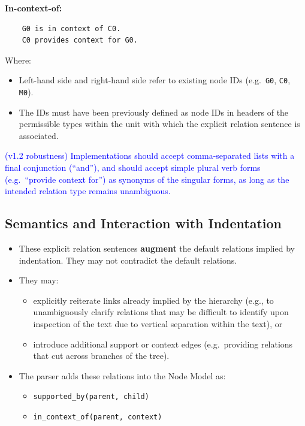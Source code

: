 \documentclass[11pt,twoside,a4paper]{article}
\begin{document}
\textbf{In-context-of:}
\begin{verbatim}
    G0 is in context of C0.
    C0 provides context for G0.
\end{verbatim}

Where:
\begin{itemize}[leftmargin=2em]
  \item Left-hand side and right-hand side refer to existing node IDs (e.g.\ \texttt{G0}, \texttt{C0}, \texttt{M0}).
  \item The IDs must have been previously defined as node IDs in headers of the permissible types within the unit with which the explicit relation sentence is associated.
\end{itemize}

\textcolor{blue}{(v1.2 robustness) Implementations should accept comma-separated lists with a final conjunction (``and''), and should accept simple plural verb forms (e.g.\ ``provide context for'') as synonyms of the singular forms, as long as the intended relation type remains unambiguous.}

\subsection{Semantics and Interaction with Indentation}

\begin{itemize}[leftmargin=2em]
  \item These explicit relation sentences \textbf{augment} the default relations implied by indentation. They may not contradict the default relations.
  \item They may:
  \begin{itemize}[leftmargin=1.5em]
    \item explicitly reiterate links already implied by the hierarchy (e.g., to unambiguously clarify relations that may be difficult to identify upon inspection of the text due to vertical separation within the text), or
    \item introduce additional support or context edges (e.g.\ providing relations that cut across branches of the tree).
  \end{itemize}
  \item The parser adds these relations into the Node Model as:
  \begin{itemize}[leftmargin=1.5em]
    \item \texttt{supported\_by(parent, child)}
    \item \texttt{in\_context\_of(parent, context)}
  \end{itemize}
\end{itemize}
\end{document}
